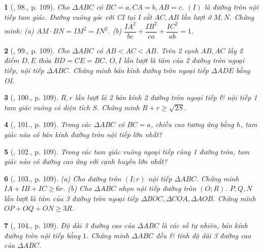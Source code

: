 \documentclass{article}
\newtheorem{baitoan}{}
\begin{document}
\begin{baitoan}[\cite{Binh_Toan_9_tap_1}, 98., p. 109]
	Cho $\Delta ABC$ có $BC = a,CA = b,AB = c$. $(I)$ là đường tròn nội tiếp tam giác. Đường vuông góc với CI tại I cắt $AC,AB$ lần lượt ở $M,N$. Chứng minh: (a) $AM\cdot BN = IM^2 = IN^2$. (b) $\dfrac{IA^2}{bc} + \dfrac{IB^2}{ca} + \dfrac{IC^2}{ab} = 1$.
\end{baitoan}

\begin{baitoan}[\cite{Binh_Toan_9_tap_1}, 99., p. 109]
	Cho $\Delta ABC$ có $AB < AC < AB$. Trên 2 cạnh $AB,AC$ lấy 2 điểm $D,E$ thỏa $BD = CE = BC$. $O,I$ lần lượt là tâm của 2 đường tròn ngoại tiếp, nội tiếp $\Delta ABC$. Chứng minh bán kính đường tròn ngoại tiếp $\Delta ADE$ bằng OI.
\end{baitoan}

\begin{baitoan}[\cite{Binh_Toan_9_tap_1}, 100., p. 109]
	$R,r$ lần lượt là 2 bán kính 2 đường tròn ngoại tiếp \& nội tiếp 1 tam giác vuông có diện tích $S$. Chứng minh $R + r\ge\sqrt{2S}$.
\end{baitoan}

\begin{baitoan}[\cite{Binh_Toan_9_tap_1}, 101., p. 109]
	Trong các $\Delta ABC$ có $BC = a$, chiều cao tương ứng bằng $h$, tam giác nào có bán kính đường tròn nội tiếp lớn nhất?
\end{baitoan}

\begin{baitoan}[\cite{Binh_Toan_9_tap_1}, 102., p. 109]
	Trong các tam giác vuông ngoại tiếp cùng 1 đường tròn, tam giác nào có đường cao ứng với cạnh huyền lớn nhất?
\end{baitoan}

\begin{baitoan}[\cite{Binh_Toan_9_tap_1}, 103., p. 109]
	(a) Cho đường tròn $(I;r)$ nội tiếp $\Delta ABC$. Chứng minh $IA + IB + IC\ge6r$. (b) Cho $\Delta ABC$  nhọn nội tiếp đường tròn $(O;R)$. $P,Q,N$ lần lượt là tâm của 3 đường tròn ngoại tiếp $\Delta BOC,\Delta COA,\Delta AOB$. Chứng minh $OP + OQ + ON\ge3R$.
\end{baitoan}

\begin{baitoan}[\cite{Binh_Toan_9_tap_1}, 104., p. 109]
	Độ dài 3 đường cao của $\Delta ABC$ là các số tự nhiên, bán kính đường tròn nội tiếp bằng $1$. Chứng minh $\Delta ABC$ đều \& tính độ dài 3 đường cao của $\Delta ABC$.
\end{baitoan}
\end{document}

